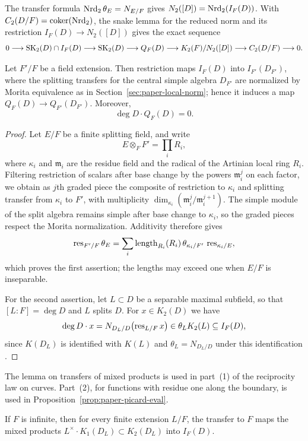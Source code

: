 The transfer formula $\operatorname{Nrd}_2\theta_E=N_{E/F}$ gives $N_2([D])=\operatorname{Nrd}_2(I_F(D))$.
With $C_2(D/F)=\operatorname{coker}(\operatorname{Nrd}_2)$, the snake lemma for the reduced norm and its restriction $I_F(D)\to N_2([D])$ gives the exact sequence
\[
 0\longrightarrow\operatorname{SK}_2(D)\cap I_F(D)\longrightarrow\operatorname{SK}_2(D)
 \longrightarrow Q_F(D)\longrightarrow K_2(F)/N_2([D])
 \longrightarrow C_2(D/F)\longrightarrow0.
\]


\begin{lemma}\label{lem:paper-Q-functorial}
Let $F'/F$ be a field extension.
Then restriction maps $I_F(D)$ into $I_{F'}(D_{F'})$, where the splitting transfers for the central simple algebra $D_{F'}$ are normalized by Morita equivalence as in Section~\ref{sec:paper-local-norm}; hence it induces a map $Q_F(D)\to Q_{F'}(D_{F'})$.
Moreover,
\[
 \deg D\cdot Q_F(D)=0.
\]
\end{lemma}
\begin{proof}
Let $E/F$ be a finite splitting field, and write
\[
 E\otimes_F F'=\prod_i R_i,
\]
where $\kappa_i$ and $\mathfrak m_i$ are the residue field and the radical of the Artinian local ring $R_i$.
Filtering restriction of scalars after base change by the powers $\mathfrak m_i^j$ on each factor, we obtain as $j$th graded piece the composite of restriction to $\kappa_i$ and splitting transfer from $\kappa_i$ to $F'$, with multiplicity $\dim_{\kappa_i}(\mathfrak m_i^j/\mathfrak m_i^{j+1})$.
The simple module of the split algebra remains simple after base change to $\kappa_i$, so the graded pieces respect the Morita normalization.
Additivity \cite{QuillenHigher} therefore gives
\[
 \operatorname{res}_{F'/F}\theta_E
  =\sum_i \operatorname{length}_{R_i}(R_i)\,
          \theta_{\kappa_i/F'}\,\operatorname{res}_{\kappa_i/E},
\]
which proves the first assertion; the lengths may exceed one when $E/F$ is inseparable.

For the second assertion, let $L\subset D$ be a separable maximal subfield, so that $[L:F]=\deg D$ and $L$ splits $D$.
For $x\in K_2(D)$ we have
\[
 \deg D\cdot x=N_{D_L/D}\bigl(\operatorname{res}_{L/F}x\bigr)\in\theta_LK_2(L)\subseteq I_F(D),
\]
since $K(D_L)$ is identified with $K(L)$ and $\theta_L=N_{D_L/D}$ under this identification \cite{KahnLevine2010}.
\end{proof}

The lemma on transfers of mixed products is used in part~(1) of the reciprocity law on curves.
Part~(2), for functions with residue one along the boundary, is used in Proposition~\ref{prop:paper-picard-eval}.

\begin{lemma}\label{lem:paper-mixed-products}
If $F$ is infinite, then for every finite extension $L/F$, the transfer to $F$ maps the mixed products $L^\times\cdot K_1(D_L)\subset K_2(D_L)$ into $I_F(D)$.
\end{lemma}

